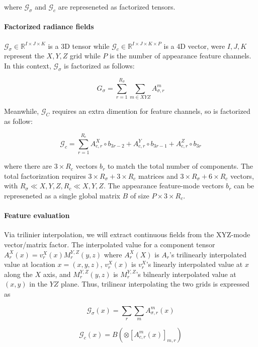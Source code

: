 \documentclass[conference]{IEEEtran}
\begin{document}
where \(\mathcal{G}_{\sigma}\) and \(\mathcal{G}_{c}\) are represeneted as factorized tensors.

\paragraph{Factorized radiance fields}

\(\mathcal{G}_{\sigma} \in \mathbb{R}^{I \times J \times K}\) is a 3D tensor while \(\mathcal{G}_{c} \in \mathbb{R}^{I \times J \times K \times P}\) is a 4D vector,
were \(I, J, K\) represent the \(X, Y, Z\) grid while \(P\) is the number
of appearance feature channels. In this context, \(\mathcal{G}_{\sigma}\) is
factorized as follows:

\[G_{\sigma} = \sum_{r=1}^{R_{\sigma}} \sum_{m \in X Y Z} A_{\sigma, r}^{m}\]

Meanwhile, \(\mathcal{G}_C\) requires an extra dimention for feature channels,
so is factorized as follow:

\[\mathcal{G}_c = \sum_{r=1}^{R_c} A_{c,r}^{X} \circ b_{3r-2} + A_{c,r}^{Y} \circ b_{3r-1} + A_{c,r}^{Z} \circ b_{3r}\]

where there are \(3 \times R_c\) vectors \(b_r\) to match the total number of components.
The total factorization requires \(3 \times R_{\sigma} + 3 \times R_{c}\) matrices and
\(3 \times R_{\sigma} + 6 \times R_{c}\) vectors, with \(R_\sigma \ll X, Y, Z,
R_c \ll X, Y, Z\). The appearance feature-mode vectors \(b_r\) can be represeneted
as a single global matrix \(B\) of size \(P \times 3 \times R_c\).


\paragraph{Feature evaluation}

Via trilinier interpolation, we will extract continuous fields from the XYZ-mode
vector/matrix factor. The interpolated value for a component tensor
\(A_r^X(x) = v_r^X(x)M_r^{Y,Z}(y,z)\) where \(A_r^X(X)\) is \(A_r\)'s trilinearly
interpolated value at location \(x = (x,y,z)\), \(v_r^X(x)\) is \(v_r^X\)'s linearly
interpolated value at \(x\) along the \(X\) axis, and \(M_r^{Y,Z}(y,z)\) is
\(M_r^{Y,Z}\)'s bilnearly interpolated value at \((x,y)\) in the \(YZ\) plane.
Thus, trilinear interpolating the two grids is expressed as

\[\mathcal{G}_{\sigma}(x) = \sum_r \sum_m A_{\sigma , r}^m(x)\]

\[\mathcal{G}_{c}(x) = B(\otimes[A_{c,r}^m(x)]_{m,r})\]
\end{document}
